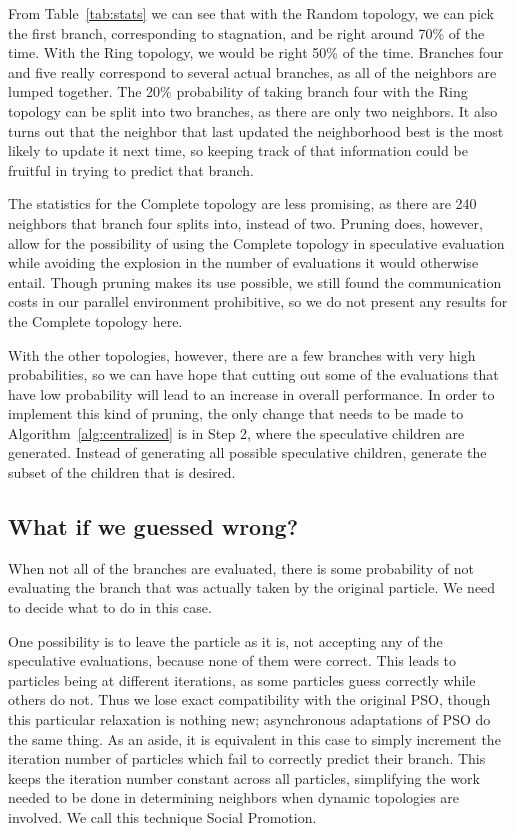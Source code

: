 \documentclass[journal,letterpaper]{IEEEtran}
\newcommand{\alg}[1]{Algorithm~\ref{alg:#1}}
\begin{document}
From Table~\ref{tab:stats} we can see that with the Random topology, we can
pick the first branch, corresponding to stagnation, and be right around 70\% of
the time.  With the Ring topology, we would be right 50\% of the time.
Branches four and five really correspond to several actual branches, as all of
the neighbors are lumped together.  The 20\% probability of taking branch four
with the Ring topology can be split into two branches, as there are only two
neighbors.  It also turns out that the neighbor that last updated the
neighborhood best is the most likely to update it next time, so keeping track
of that information could be fruitful in trying to predict that branch.

The statistics for the Complete topology are less promising, as there are 240
neighbors that branch four splits into, instead of two.  Pruning does, however,
allow for the possibility of using the Complete topology in speculative
evaluation while avoiding the explosion in the number of evaluations it would
otherwise entail.  Though pruning makes its use possible, we still found the
communication costs in our parallel environment prohibitive, so we do not
present any results for the Complete topology here.

With the other topologies, however, there are a few branches with very high
probabilities, so we can have hope that cutting out some of the evaluations
that have low probability will lead to an increase in overall performance.  In
order to implement this kind of pruning, the only change that needs to be made
to \alg{centralized} is in Step 2, where the speculative children are
generated.  Instead of generating all possible speculative children, generate
the subset of the children that is desired.

\subsection{What if we guessed wrong?}
\label{sec:wrong}

When not all of the branches are evaluated, there is some probability of not
evaluating the branch that was actually taken by the original particle.  We 
need to decide what to do in this case.  

One possibility is to leave the particle as it is, not accepting any of the
speculative evaluations, because none of them were correct.  This leads to
particles being at different iterations, as some particles guess correctly
while others do not.  Thus we lose exact compatibility with the original PSO,
though this particular relaxation is nothing new; asynchronous adaptations of
PSO do the same thing.  As an aside, it is equivalent in this case to simply
increment the iteration number of particles which fail to correctly predict
their branch.  This keeps the iteration number constant across all particles,
simplifying the work needed to be done in determining neighbors when dynamic
topologies are involved.  We call this technique Social Promotion.
\end{document}
